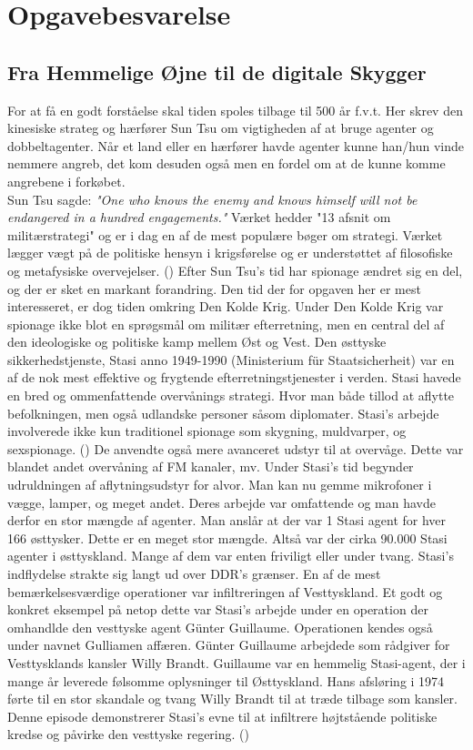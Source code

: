 \newpage
\section{Opgavebesvarelse}\label{sec:OpgaveBesvarelse}

\subsection{Fra Hemmelige Øjne til de digitale Skygger}\label{sec:Redegorsel}
For at få en godt forståelse skal tiden spoles tilbage til 500 år f.v.t. Her skrev den kinesiske strateg og hærfører Sun Tsu om vigtigheden af at bruge agenter og dobbeltagenter. Når et land eller en hærfører havde agenter kunne han/hun vinde nemmere angreb,  det kom desuden også men en fordel om at de kunne komme angrebene i forkøbet. \\ Sun Tsu sagde: \emph{"One who knows the enemy and knows himself will not be endangered in a hundred engagements."} Værket hedder "13 afsnit om militærstrategi" og er i dag en af de mest populære bøger om strategi. Værket lægger vægt på de politiske hensyn i krigsførelse og er understøttet af filosofiske og metafysiske overvejelser. (\cite{SunTsu})
Efter Sun Tsu's tid har spionage ændret sig en del, og der er sket en markant forandring. Den tid der for opgaven her er mest interesseret, er dog tiden omkring Den Kolde Krig. Under Den Kolde Krig var spionage ikke blot en sprøgsmål om militær efterretning, men en central del af den ideologiske og politiske kamp mellem Øst og Vest. Den østtyske sikkerhedstjenste, Stasi  anno 1949-1990 (Ministerium für Staatsicherheit) var en af de nok mest effektive og frygtende efterretningstjenester i verden. Stasi havede en bred og ommenfattende overvånings strategi. Hvor man både tillod at aflytte befolkningen, men også udlandske personer såsom diplomater. Stasi's arbejde involverede ikke kun traditionel spionage som skygning, muldvarper, og sexspionage. (\cite{stasi}) De anvendte også mere avanceret udstyr til at overvåge. Dette var blandet andet overvåning af FM kanaler, mv. Under Stasi's tid begynder udruldningen af aflytningsudstyr for alvor. Man kan nu gemme mikrofoner i vægge, lamper, og meget andet. Deres arbejde var omfattende og man havde derfor en stor mængde af agenter. Man anslår at der var 1 Stasi agent for hver 166 østtysker. Dette er en meget stor mængde. Altså var der cirka 90.000 Stasi agenter i østtyskland. Mange af dem var enten friviligt eller under tvang. Stasi's indflydelse strakte sig langt ud over DDR's grænser. En af de mest bemærkelsesværdige operationer var infiltreringen af Vesttyskland. Et godt og konkret eksempel på netop dette var Stasi's arbejde under en operation der omhandlde den vesttyske agent Günter Guillaume. Operationen kendes også under navnet Gulliamen affæren. Günter Guillaume arbejdede som rådgiver for Vesttysklands kansler Willy Brandt. Guillaume var en hemmelig Stasi-agent, der i mange år leverede følsomme oplysninger til Østtyskland. Hans afsløring i 1974 førte til en stor skandale og tvang Willy Brandt til at træde tilbage som kansler. Denne episode demonstrerer Stasi's evne til at infiltrere højtstående politiske kredse og påvirke den vesttyske regering. (\cite{guillaume})

